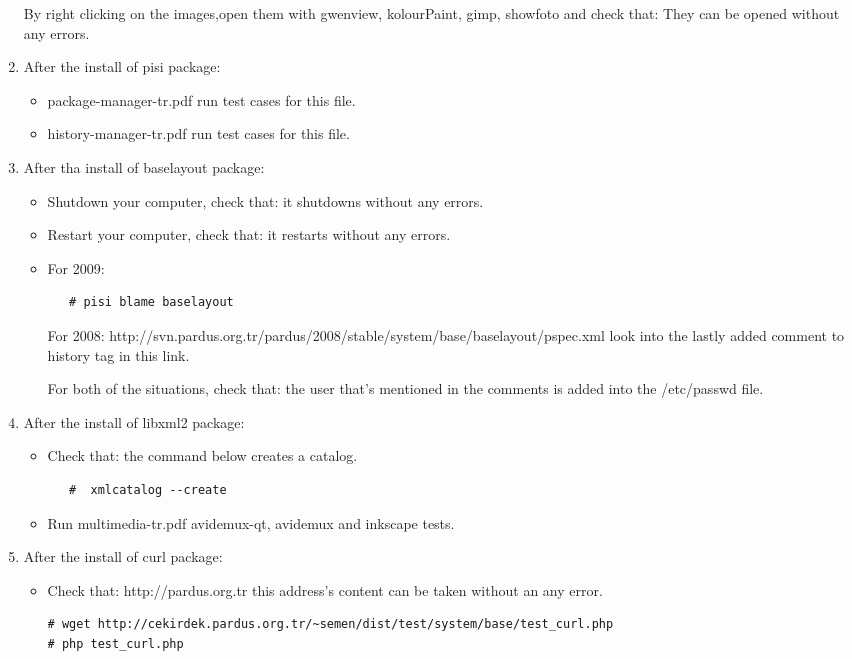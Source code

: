 \documentclass[a4paper,10pt]{article}
\begin{document}
\begin{enumerate}
By right clicking on the images,open them with gwenview, kolourPaint, gimp, showfoto and check that: They can be opened without any errors.
\item After the install of pisi package:
\begin{itemize}
 \item package-manager-tr.pdf run test cases for this file.
 \item history-manager-tr.pdf run test cases for this file.
\end{itemize}
\item After tha install of baselayout package:
\begin{itemize}
 \item Shutdown your computer, check that: it shutdowns without any errors.
 \item Restart your computer, check that: it restarts without any errors.
 \item For 2009:
  \begin{verbatim}
   # pisi blame baselayout
  \end{verbatim}
      For 2008: http://svn.pardus.org.tr/pardus/2008/stable/system/base/baselayout/pspec.xml  look into the lastly added comment to history tag in this link.

   For both of the situations, check that: the user that's mentioned in the comments is added into the /etc/passwd file.

\end{itemize}
\item After the install of libxml2 package:

\begin{itemize}
\item Check that: the command below creates a catalog.
  \begin{verbatim}
   #  xmlcatalog --create
  \end{verbatim}
\item Run multimedia-tr.pdf avidemux-qt, avidemux and inkscape tests.
\end{itemize}
\item After the install of curl package:

\begin{itemize}
\item Check that: http://pardus.org.tr this address's content can be taken without an any error.
\begin{verbatim}
# wget http://cekirdek.pardus.org.tr/~semen/dist/test/system/base/test_curl.php
# php test_curl.php
\end{verbatim}


\end{itemize}
\end{enumerate}
\end{document}
